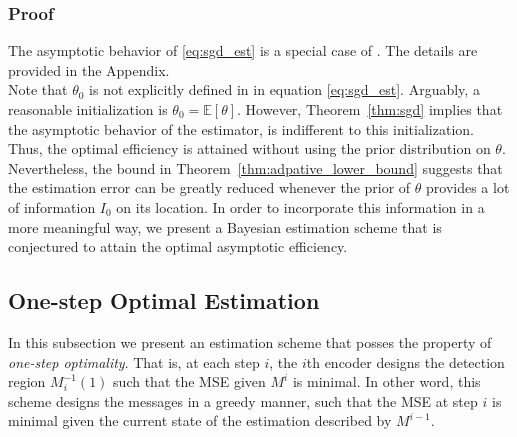 \documentclass[letterpaper, conference]{IEEEtran}      %
\begin{document}
\subsubsection*{Proof}
The asymptotic behavior of \eqref{eq:sgd_est} is a special case of  \cite[Thm. 4]{polyak1992acceleration}. The details are provided in the Appendix.\\


Note that $\theta_0$ is not explicitly defined in 
in equation \eqref{eq:sgd_est}. Arguably, a reasonable initialization is $\theta_0 = \mathbb E [\theta]$. However, Theorem~\ref{thm:sgd} implies that the asymptotic behavior of the estimator, is indifferent to this initialization. Thus, the optimal efficiency is attained without using the prior distribution on $\theta$. Nevertheless, the bound in Theorem~\ref{thm:adpative_lower_bound} suggests that the estimation error can be greatly reduced whenever the prior of $\theta$ provides a lot of information $I_0$ on its location. In order to incorporate this information in a more meaningful way, we present a Bayesian estimation scheme that is conjectured to attain the optimal asymptotic efficiency. 

\subsection{One-step Optimal Estimation}
In this subsection we present an estimation scheme that posses the property of \emph{one-step optimality}. That is, at each step $i$, the $i$th encoder designs the detection region $M_i^{-1}(1)$ such that the MSE given $M^i$ is minimal. In other word, this scheme designs the messages in a greedy manner, such that the MSE at step $i$ is minimal given the current state of the estimation described by $M^{i-1}$. \\
\end{document}
